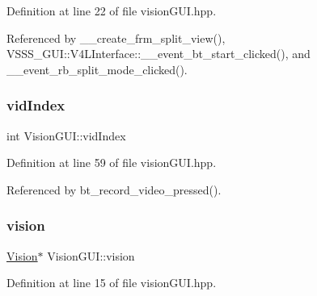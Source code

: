 Definition at line 22 of file vision\+G\+U\+I.\+hpp.



Referenced by \+\_\+\+\_\+create\+\_\+frm\+\_\+split\+\_\+view(), V\+S\+S\+S\+\_\+\+G\+U\+I\+::\+V4\+L\+Interface\+::\+\_\+\+\_\+event\+\_\+bt\+\_\+start\+\_\+clicked(), and \+\_\+\+\_\+event\+\_\+rb\+\_\+split\+\_\+mode\+\_\+clicked().

\mbox{\label{class_vision_g_u_i_a778e610a8026011498e6a685d88b3fbe}} 
\subsubsection{\texorpdfstring{vid\+Index}{vidIndex}}
{\footnotesize\ttfamily int Vision\+G\+U\+I\+::vid\+Index\hspace{0.3cm}{\ttfamily [private]}}



Definition at line 59 of file vision\+G\+U\+I.\+hpp.



Referenced by bt\+\_\+record\+\_\+video\+\_\+pressed().

\mbox{\label{class_vision_g_u_i_a36aba058af844ec6cbe0c945c616cd5f}} 
\subsubsection{\texorpdfstring{vision}{vision}}
{\footnotesize\ttfamily \hyperlink{class_vision}{Vision}$\ast$ Vision\+G\+U\+I\+::vision}



Definition at line 15 of file vision\+G\+U\+I.\+hpp.



